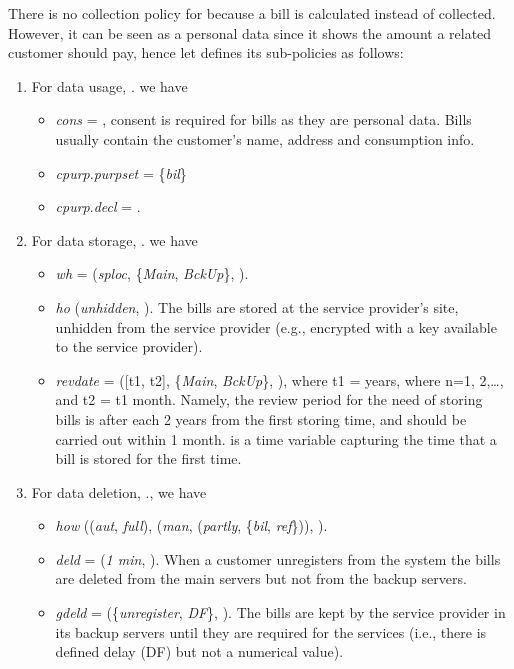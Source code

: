 \documentclass[a4paper]{article}
\begin{document}
There is no collection policy for  because a bill is calculated instead of collected. However, it can be seen as a personal data since it shows the amount a related customer should pay, hence let defines its sub-policies as follows: 

\begin{enumerate}
\item For data usage, . we have 
\begin{itemize}
\item \textit{cons} = , consent is required for bills as they are personal data. Bills usually contain the customer's name, address and consumption info.   
\item  \textit{cpurp}.\textit{purpset} = \{\textit{bil}\}
\item \textit{cpurp}.\textit{decl} = .  
\end{itemize}

\item For data storage, . we have 
\begin{itemize} 
\item \textit{wh} = (\textit{sploc}, \{\textit{Main}, \textit{BckUp}\}, ).     

\item \textit{ho}  (\textit{unhidden}, ). The bills are stored at the service provider's site, unhidden from the service provider (e.g., encrypted with a key available to the service provider). 

\item \textit{revdate} = ([t1, t2], \{\textit{Main}, \textit{BckUp}\}, ), where t1 =      years, where n={1, 2,\dots,} and t2 = t1   month. Namely, the review period for the need of storing bills is   after each 2 years from the first storing time, and should be carried out within 1 month.  is a time variable capturing the time that a bill is stored for the first time.
\end{itemize}   

\item For data deletion, ., we have 
\begin{itemize} 
\item \textit{how}  ((\textit{aut}, \textit{full}), (\textit{man}, (\textit{partly}, \{\textit{bil}, \textit{ref}\})), ).
 
\item \textit{deld} = (\textit{1 min}, ).  When a customer unregisters from the system the bills are deleted from the main servers but not from the backup servers. 

\item \textit{gdeld} = (\{\textit{unregister}, \textit{DF}\}, ).  The  bills are kept by the service provider in its backup servers until they are required for the services (i.e., there is defined delay (DF) but not a numerical value).
\end{itemize}   


\end{enumerate}
\end{document}
